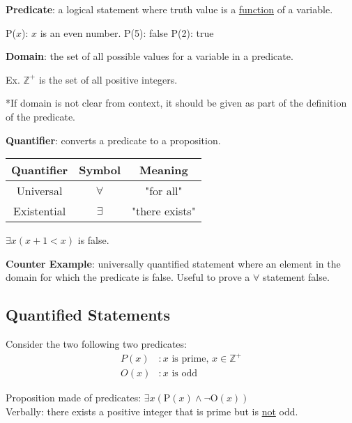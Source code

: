 \textbf{Predicate}: a logical statement where truth value is a \underline{function} of a variable.

\begin{center}
  P($x$): $x$ is an even number. \qquad P(5): false \qquad P(2): true
\end{center}

\noindent \textbf{Domain}: the set of all possible values for a variable in a predicate.

\begin{center}
  Ex. $ \mathbb{Z}^+ $ is the set of all positive integers.

  *If domain is not clear from context, it should be given as part of the definition of the predicate.
\end{center}

\noindent \textbf{Quantifier}: converts a predicate to a proposition.
\qquad
\begin{tabular}{c|c|c}
  Quantifier  & Symbol     & Meaning        \\
  \hline
  Universal   & $\forall $ & "for all"      \\
  Existential & $\exists$  & "there exists" \\
\end{tabular}

\begin{center}
  $\exists x (x+1 < x)$ is false.
\end{center}

\noindent \textbf{Counter Example}: universally quantified statement where an element in the domain
for which the predicate is false. Useful to prove a $\forall$ statement false.

\subsection{Quantified Statements}

Consider the two following two predicates:
\begin{align*}
  P(x) & : x \text{ is prime, } x \in \mathbb{Z}^+ \\
  O(x) & : x \text{ is odd}
\end{align*}

\begin{center}
  Proposition made of predicates: \qquad $\exists x (\text{P}(x) \land \lnot \text{O}(x))$ \\
  Verbally: there exists a positive integer that is prime but is \underline{not} odd.
\end{center}

